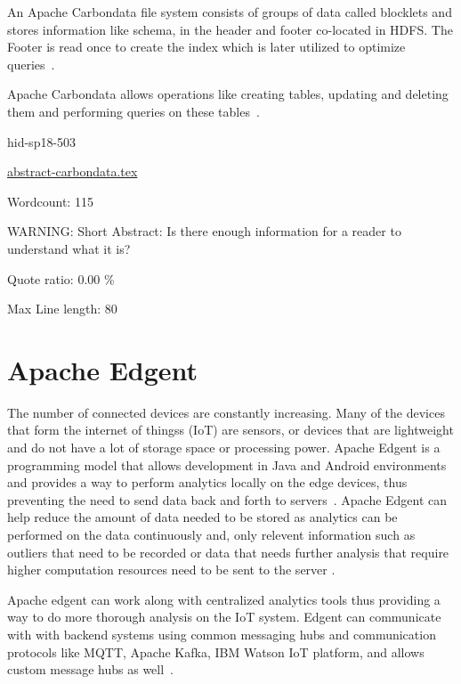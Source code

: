 An Apache Carbondata file system consists of groups of data called blocklets
and stores information like schema, in the header and footer co-located in HDFS.
The Footer is read once to create the index which is later utilized to optimize 
queries~\cite{hid-sp18-503-www-carbondata-docs}.

Apache Carbondata allows operations like creating tables, updating and
deleting them and performing queries on these 
tables~\cite{hid-sp18-503-www-carbondata-mgmt}.





\begin{IU}

hid-sp18-503

\href{https://github.com/cloudmesh-community/hid-sp18-503/blob/master//technology/abstract-carbondata.tex}{abstract-carbondata.tex}

 

Wordcount: 115

WARNING: Short Abstract: Is there enough information for a reader to understand what it is?


Quote ratio: 0.00 \%
 
Max Line length: 80
\end{IU}

\section{Apache Edgent}

The number of connected devices are constantly increasing.
Many of the devices that form the internet of thingss (IoT) are sensors,
or devices that are lightweight and do not have a lot of storage space
or processing power.
Apache Edgent is a programming model that allows development in Java and
Android environments and provides a way to perform analytics locally on
the edge devices, thus preventing the need to send data back and forth to
servers~\cite{hid-sp18-503-www-edgent}. Apache Edgent can help reduce
the amount of data needed to be stored as analytics can be performed on
the data continuously and, only relevent information such as outliers
that need to be recorded or data that needs further analysis that require
higher computation resources need to be sent to the server
\cite{hid-sp18-503-www-edgent-docs}.

Apache edgent can work along with centralized analytics tools thus providing
a way to do more thorough analysis on the IoT system. Edgent can
communicate with with backend systems using common messaging hubs and
communication protocols like MQTT, Apache Kafka, IBM Watson IoT platform,
and allows custom message hubs as well~\cite{hid-sp18-503-www-edgent-docs}.


